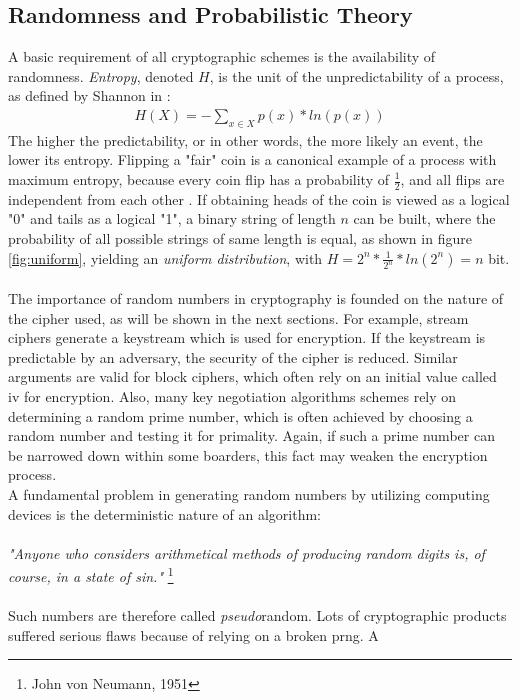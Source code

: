 \subsection{Randomness and Probabilistic Theory}
A basic requirement of all cryptographic schemes is the availability of randomness. \textit{Entropy}, denoted $H$, is the unit of the unpredictability of a process, as
 defined by Shannon in \cite{6773024}:
 \begin{align}
 H(X) = - \sum_{x \in X}^{} p(x) * ln(p(x))
\end{align}
The higher the predictability, or in other words, the more likely an event, the lower its entropy. Flipping a "fair" coin is a canonical 
example of a process with maximum entropy, because every coin flip has a probability of $\frac{1}{2}$, and all flips are independent from each other \cite{1621063}.
If obtaining heads of the coin is viewed as a logical "0" and tails as a logical "1", a binary string of length $n$ can be built, where the probability of all possible
strings of same length is equal, as shown in figure \ref{fig:uniform}, yielding an \textit{uniform distribution}, with
$H = 2^n*\frac{1}{2^n}*ln(2^n) = n$ bit. 
\\
\\
The importance of random numbers in cryptography is founded on the nature of the cipher used, as will be shown in the next sections. For example,
stream ciphers generate a keystream which is used
for encryption. If the keystream is predictable by an adversary, the security of the cipher is reduced. Similar arguments are valid for block ciphers, which often
rely on an initial value called \gls{iv} for encryption. Also, many key negotiation algorithms schemes rely on determining a random prime number, which is often 
achieved by choosing a random number and testing it for primality. Again, if such a prime number can be narrowed down within some boarders, this fact may
weaken the encryption process.
\\
A fundamental problem in generating random numbers by utilizing computing devices is the deterministic nature of an algorithm:
\\
\\
\textit{"Anyone who considers arithmetical methods of producing random digits is, of course, in a state of sin."} \footnote{John von Neumann, 1951}
\\
\\
Such numbers are therefore called \textit{pseudo}random. Lots of cryptographic products suffered serious flaws because of relying on a broken \gls{prng}. A 
